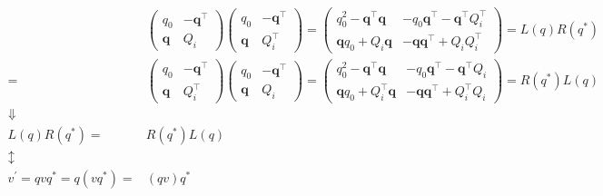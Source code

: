 \documentclass[
]{book}
\theoremstyle{definition}
\theoremstyle{definition}
\theoremstyle{definition}
\theoremstyle{definition}
\theoremstyle{remark}
\begin{document}
\[
\begin{aligned}
 & \begin{pmatrix}q_{{\scriptscriptstyle 0}} & -\boldsymbol{q}^{\intercal}\\
\boldsymbol{q} & Q_{{\scriptscriptstyle i}}
\end{pmatrix}\begin{pmatrix}q_{{\scriptscriptstyle 0}} & -\boldsymbol{q}^{\intercal}\\
\boldsymbol{q} & Q_{{\scriptscriptstyle i}}^{\intercal}
\end{pmatrix}=\begin{pmatrix}q_{{\scriptscriptstyle 0}}^{2}-\boldsymbol{q}^{\intercal}\boldsymbol{q} & -q_{{\scriptscriptstyle 0}}\boldsymbol{q}^{\intercal}-\boldsymbol{q}^{\intercal}Q_{{\scriptscriptstyle i}}^{\intercal}\\
\boldsymbol{q}q_{{\scriptscriptstyle 0}}+Q_{{\scriptscriptstyle i}}\boldsymbol{q} & -\boldsymbol{q}\boldsymbol{q}^{\intercal}+Q_{{\scriptscriptstyle i}}Q_{{\scriptscriptstyle i}}^{\intercal}
\end{pmatrix}=L\left(q\right)R\left(q^{*}\right)\\
= & \begin{pmatrix}q_{{\scriptscriptstyle 0}} & -\boldsymbol{q}^{\intercal}\\
\boldsymbol{q} & Q_{{\scriptscriptstyle i}}^{\intercal}
\end{pmatrix}\begin{pmatrix}q_{{\scriptscriptstyle 0}} & -\boldsymbol{q}^{\intercal}\\
\boldsymbol{q} & Q_{{\scriptscriptstyle i}}
\end{pmatrix}=\begin{pmatrix}q_{{\scriptscriptstyle 0}}^{2}-\boldsymbol{q}^{\intercal}\boldsymbol{q} & -q_{{\scriptscriptstyle 0}}\boldsymbol{q}^{\intercal}-\boldsymbol{q}^{\intercal}Q_{{\scriptscriptstyle i}}\\
\boldsymbol{q}q_{{\scriptscriptstyle 0}}+Q_{{\scriptscriptstyle i}}^{\intercal}\boldsymbol{q} & -\boldsymbol{q}\boldsymbol{q}^{\intercal}+Q_{{\scriptscriptstyle i}}^{\intercal}Q_{{\scriptscriptstyle i}}
\end{pmatrix}=R\left(q^{*}\right)L\left(q\right)\\
\Downarrow\\
L\left(q\right)R\left(q^{*}\right)= & R\left(q^{*}\right)L\left(q\right)\\
\updownarrow\\
v^{\prime}=qvq^{*}=q\left(vq^{*}\right)= & \left(qv\right)q^{*}
\end{aligned}
\]
\end{document}
